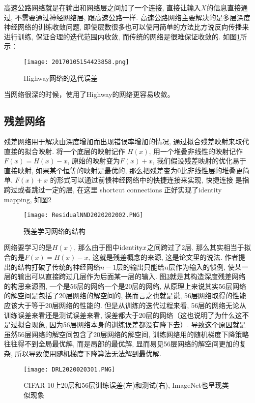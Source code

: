 高速公路网络就是在输出和网络层之间加了一个连接, 直接让输入$X$的信息直接通过, 不需要通过神经网络层, 跟高速公路一样.
高速公路网络主要解决的是多层深度神经网络的训练收敛问题, 即使层数很多也可以使用简单的方法比方说反向传播来进行训练, 保证合理的迭代范围内收敛, 而传统的网络是很难保证收敛的. 如图\ref{20170105154423858}所示：
\begin{figure}[H]
\centering
\texttt{[image: 20170105154423858.png]}
\caption{Highway网络的迭代误差}
\label{20170105154423858}
\end{figure}
当网络很深的时候，使用了Highway的网络更容易收敛。
\subsection{残差网络}
残差网络用于解决由深度增加而出现错误率增加的情况, 通过拟合残差映射来取代直接的拟合映射.
将一个底层的映射记作 $H(x)$, 用一个堆叠非线性的映射记作 $F(x) = H(x) - x$, 原始的映射变为$F(x) + x$, 我们假设残差映射的优化易于直接映射, 如果某个恒等的映射是最优的, 那么把残差变为0比非线性层的堆叠更简单.
$F(x) + x$ 的形式可以通过前愦神经网络中的快捷连接来实现, 快捷连接 是指跨过或者跳过一定的层, 在这里 shortcut connections 正好实现了identity mapping, 如图\ref{ResidualNND2020202002}
\begin{figure}[H]
\centering
\texttt{[image: ResidualNND2020202002.PNG]}
\caption{残差学习网络的结构}
\label{ResidualNND2020202002}
\end{figure}
网络要学习的是$H(x)$, 那么由于图中$\textup{identity} x$之间跨过了2层, 那么其实相当于拟合的是$F(x)=H(x)-x$, 这就是残差概念的来源, 这是论文里的说法.
作者提出的结构打破了传统的神经网络$n-1$层的输出只能给$n$层作为输入的惯例, 使某一层的输出可以直接跨过几层作为后面某一层的输入.
图\ref{DRL2020020301}就是其构造深度残差网络的构思来源图, 一个是56层的网络一个是20层的网络, 从原理上来说其实56层网络的解空间是包括了20层网络的解空间的, 换而言之也就是说, 56层网络取得的性能应该大于等于20层网络的性能的.
但是从训练的迭代过程来看, 56层的网络无论从训练误差来看还是测试误差来看, 误差都大于20层的网络（这也说明了为什么这不是过拟合现象, 因为56层网络本身的训练误差都没有降下去）.
导致这个原因就是虽然56层网络的解空间包含了20层网络的解空间, 训练网络用的随机梯度下降策略往往得不到全局最优解, 而是局部的最优解, 显而易见56层网络的解空间更加的复杂, 所以导致使用随机梯度下降算法无法解到最优解.
\begin{figure}[H]
\centering
\texttt{[image: DRL2020020301.PNG]}
\caption{CIFAR-10上20层和56层训练误差(左)和测试(右), ImageNet也呈现类似现象}
\label{DRL2020020301}
\end{figure}


